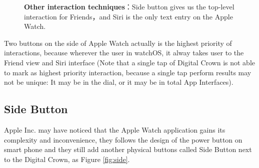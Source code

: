 \begin{figure}[H]
    \kaishu
    \centering
    \caption{\textbf{Other interaction techniques}：Side button gives us the top-level interaction for Friends，and Siri is the only text entry on the Apple Watch.}
    \label{fig:others}
\end{figure}

Two buttons on the side of Apple Watch actually is the highest priority of interactions, because wherever the user in watchOS, it alway takes user to the Friend view and Siri interface (Note that a single tap of Digital Crown is not able to mark as highest priority interaction, because a single tap perform results may not be unique: It may be in the dial, or it may be in total App Interfaces).

\subsection{Side Button}

Apple Inc. may have noticed that the Apple Watch application gains its complexity and inconvenience, they follows the design of the power button on smart phone and they still add another physical buttons called Side Button next to the Digital Crown, as Figure \ref{fig:side}.

